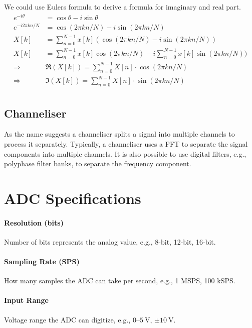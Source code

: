 We could use Eulers formula to derive a formula for imaginary and real part.
\begin{align*}
  e^{-i\theta} &= \cos{\theta} - i\sin{\theta} \\
  e^{-i2\pi kn/N} &= \cos(2\pi kn/N) - i\sin(2\pi kn/N) \\
  X[k] &= \sum_{n=0}^{N-1} x[k](\cos(2\pi kn/N) - i\sin(2\pi kn/N)) \\
  X[k] &= \sum_{n=0}^{N-1} x[k]\cos(2\pi kn/N) - i\sum_{n=0}^{N-1} x[k]\sin(2\pi kn/N)) \\
  \Rightarrow& \Re(X[k]) = \sum_{n=0}^{N-1} X[n]\cdot\cos(2\pi kn/N) \\
  \Rightarrow& \Im(X[k]) = \sum_{n=0}^{N-1} X[n]\cdot\sin(2\pi kn/N) \\
\end{align*}




\subsection{Channeliser}
As the name suggests a channeliser splits a signal into multiple channels to process it separately.
Typically, a channeliser uses a FFT to separate the signal components into multiple channels. It is also possible to use digital filters, e.g., polyphase filter banks, to separate the frequency component.




\section{ADC Specifications} %
\paragraph{Resolution (bits)} Number of bits represents the analog value, e.g., 8-bit, 12-bit, 16-bit.

\paragraph{Sampling Rate (SPS)} How many samples the ADC can take per second, e.g., 1 MSPS, 100 kSPS.

\paragraph{Input Range} Voltage range the ADC can digitize, e.g., $0$–$\SI{5}{\volt}$, $\pm\SI{10}{\volt}$.

